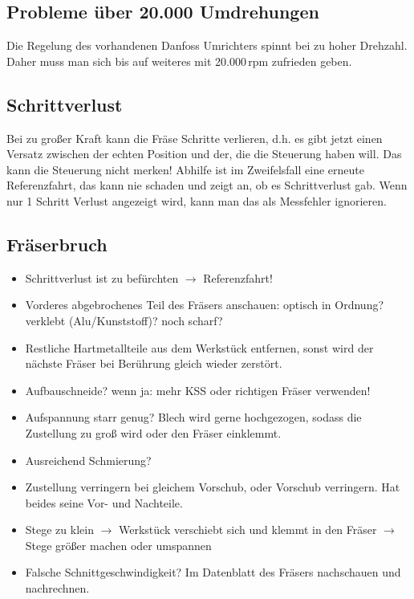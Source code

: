 \documentclass{\basedir/fablab-document}
\begin{document}
\subsection{Probleme über 20.000 Umdrehungen}
Die Regelung des vorhandenen Danfoss Umrichters spinnt bei zu hoher Drehzahl. Daher muss man sich bis auf weiteres mit 20.000\,rpm zufrieden geben.

\subsection{Schrittverlust}
Bei zu großer Kraft kann die Fräse Schritte verlieren, d.h. es gibt jetzt einen Versatz zwischen der echten Position und der, die die Steuerung haben will. Das kann die Steuerung nicht merken! Abhilfe ist im Zweifelsfall eine erneute Referenzfahrt, das kann nie schaden und zeigt an, ob es Schrittverlust gab. Wenn nur 1 Schritt Verlust angezeigt wird, kann man das als Messfehler ignorieren.

\subsection{Fräserbruch}
\begin{itemize}
 \item Schrittverlust ist zu befürchten $\rightarrow$ Referenzfahrt!
 \item Vorderes abgebrochenes Teil des Fräsers anschauen: optisch in Ordnung? verklebt (Alu/Kunststoff)? noch scharf?
 \item Restliche Hartmetallteile aus dem Werkstück entfernen, sonst wird der nächste Fräser bei Berührung gleich wieder zerstört.
 \item Aufbauschneide? wenn ja: mehr KSS oder richtigen Fräser verwenden!
 \item Aufspannung starr genug? Blech wird gerne hochgezogen, sodass die Zustellung zu groß wird oder den Fräser einklemmt.
 \item Ausreichend Schmierung?
 \item Zustellung verringern bei gleichem Vorschub, oder Vorschub verringern. Hat beides seine Vor- und Nachteile.
 \item Stege zu klein $\rightarrow$ Werkstück verschiebt sich und klemmt in den Fräser $\rightarrow$ Stege größer machen oder umspannen
 \item Falsche Schnittgeschwindigkeit? Im Datenblatt des Fräsers nachschauen und nachrechnen.
 \end{itemize}
\end{document}
